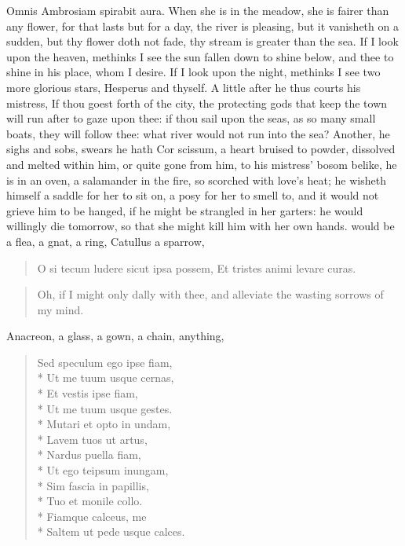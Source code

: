 Omnis Ambrosiam spirabit aura. When she is in the meadow, she is
fairer than any flower, for that lasts but for a day, the river is
pleasing, but it vanisheth on a sudden, but thy flower doth not fade,
thy stream is greater than the sea. If I look upon the heaven, methinks
I see the sun fallen down to shine below, and thee to shine in his
place, whom I desire. If I look upon the night, methinks I see two more
glorious stars, Hesperus and thyself. A little after he thus courts his
mistress,  If thou goest forth of the city, the protecting gods
that keep the town will run after to gaze upon thee: if thou sail upon
the seas, as so many small boats, they will follow thee: what river
would not run into the sea? Another, he sighs and sobs, swears he hath
Cor scissum, a heart bruised to powder, dissolved and melted within
him, or quite gone from him, to his mistress' bosom belike, he is in an
oven, a salamander in the fire, so scorched with love's heat; he
wisheth himself a saddle for her to sit on, a posy for her to smell to,
and it would not grieve him to be hanged, if he might be strangled in
her garters: he would willingly die tomorrow, so that she might kill
him with her own hands. \Ovid would be a flea, a gnat, a ring,
Catullus a sparrow,

\begin{latin}
\begin{verse}
O si tecum ludere sicut ipsa possem,
Et tristes animi levare curas.
\end{verse}
\end{latin}
\translationrule%
\begin{verse}%
Oh, if I might only dally with thee,
and alleviate the wasting sorrows of my mind.
\end{verse}%

Anacreon, a glass, a gown, a chain, anything,

\begin{latin}
\begin{verse}
Sed speculum ego ipse fiam,\\*
Ut me tuum usque cernas,\\*
Et vestis ipse fiam,\\*
Ut me tuum usque gestes.\\*
Mutari et opto in undam,\\*
Lavem tuos ut artus,\\*
Nardus puella fiam,\\*
Ut ego teipsum inungam,\\*
Sim fascia in papillis,\\*
Tuo et monile collo.\\*
Fiamque calceus, me\\*
Saltem ut pede usque calces.
\end{verse}
\end{latin}

